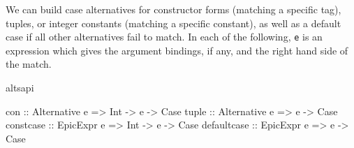 

\noindent
We can build case alternatives for constructor forms (matching a
specific tag), tuples, or integer constants (matching a specific
constant), as well as a default case if all other alternatives fail to
match. In each of the following, \texttt{e} is an expression which
gives the argument bindings, if any, and the right hand side of the
match.


\begin{SaveVerbatim}{altsapi}

con         :: Alternative e => Int -> e -> Case
tuple       :: Alternative e =>        e -> Case
constcase   :: EpicExpr e    => Int -> e -> Case
defaultcase :: EpicExpr e    =>        e -> Case

\end{SaveVerbatim}

